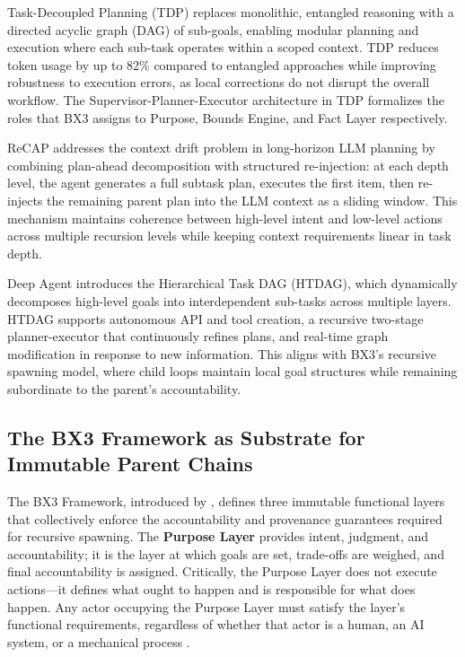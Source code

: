 Task-Decoupled Planning (TDP) \cite{task-decoupled-planning} replaces monolithic, entangled reasoning with a directed acyclic graph (DAG) of sub-goals, enabling modular planning and execution where each sub-task operates within a scoped context. TDP reduces token usage by up to 82\% compared to entangled approaches while improving robustness to execution errors, as local corrections do not disrupt the overall workflow. The Supervisor-Planner-Executor architecture in TDP formalizes the roles that BX3 assigns to Purpose, Bounds Engine, and Fact Layer respectively.

ReCAP \cite{recap} addresses the context drift problem in long-horizon LLM planning by combining plan-ahead decomposition with structured re-injection: at each depth level, the agent generates a full subtask plan, executes the first item, then re-injects the remaining parent plan into the LLM context as a sliding window. This mechanism maintains coherence between high-level intent and low-level actions across multiple recursion levels while keeping context requirements linear in task depth.

Deep Agent \cite{deep-agent} introduces the Hierarchical Task DAG (HTDAG), which dynamically decomposes high-level goals into interdependent sub-tasks across multiple layers. HTDAG supports autonomous API and tool creation, a recursive two-stage planner-executor that continuously refines plans, and real-time graph modification in response to new information. This aligns with BX3's recursive spawning model, where child loops maintain local goal structures while remaining subordinate to the parent's accountability.

\subsection{The BX3 Framework as Substrate for Immutable Parent Chains}

The BX3 Framework, introduced by , defines three immutable functional layers that collectively enforce the accountability and provenance guarantees required for recursive spawning. The \textbf{Purpose Layer} provides intent, judgment, and accountability; it is the layer at which goals are set, trade-offs are weighed, and final accountability is assigned. Critically, the Purpose Layer does not execute actions---it defines what ought to happen and is responsible for what does happen. Any actor occupying the Purpose Layer must satisfy the layer's functional requirements, regardless of whether that actor is a human, an AI system, or a mechanical process \cite{bx3-whitepaper-v2}.

